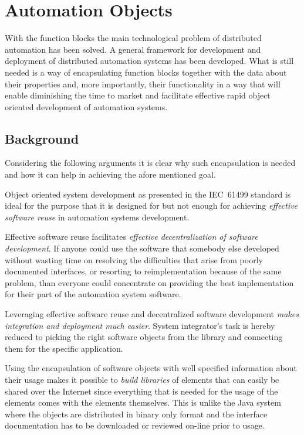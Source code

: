 \chapter{Automation Objects}
\label{automationobjects}

With the function blocks the main technological problem of
distributed automation has been solved. A general framework
for development and deployment of distributed automation
systems has been developed. What is still needed is a way of
encapsulating function blocks together with the data about
their properties and, more importantly, their functionality
in a way that will enable diminishing the time to market
and facilitate effective rapid object oriented development
of automation systems.

\section{Background}
Considering the following arguments it is clear why such
encapsulation is needed and how it can help in achieving the
afore mentioned goal.

Object oriented system development as presented in the
IEC~61499 standard is ideal for the purpose that it is
designed for but not enough for achieving \emph{effective
  software reuse} in automation systems development.

Effective software reuse facilitates \textit{effective
  decentralization of software development}. If anyone could
use the software that somebody else developed without
wasting time on resolving the difficulties that arise from
poorly documented interfaces, or resorting to
reimplementation because of the same problem, than everyone
could concentrate on providing the best implementation for
their part of the automation system software.

Leveraging effective software reuse and decentralized
software development \textit{makes integration and
  deployment much easier}. System integrator's task is
hereby reduced to picking the right software objects from
the library and connecting them for the specific
application.

Using the encapsulation of software objects with well
specified information about their usage makes it possible to
\textit{build libraries} of elements that can easily be
shared over the Internet since everything that is needed for
the usage of the elements comes with the elements
themselves. This is unlike the Java system where the objects
are distributed in binary only format and the interface
documentation has to be downloaded or reviewed on-line prior
to usage.

